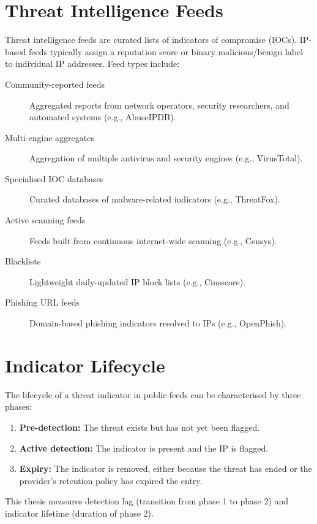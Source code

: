 \documentclass[12pt, a4paper, twoside]{report}
\begin{document}
\section{Threat Intelligence Feeds}

Threat intelligence feeds are curated lists of indicators of compromise (IOCs). IP-based feeds
typically assign a reputation score or binary malicious/benign label to individual IP addresses.
Feed types include:

\begin{description}
  \item[Community-reported feeds] Aggregated reports from network operators, security researchers,
    and automated systems (e.g., AbuseIPDB).
  \item[Multi-engine aggregates] Aggregation of multiple antivirus and security engines
    (e.g., VirusTotal).
  \item[Specialised IOC databases] Curated databases of malware-related indicators
    (e.g., ThreatFox).
  \item[Active scanning feeds] Feeds built from continuous internet-wide scanning
    (e.g., Censys).
  \item[Blacklists] Lightweight daily-updated IP block lists
    (e.g., Cinsscore).
  \item[Phishing URL feeds] Domain-based phishing indicators resolved to IPs
    (e.g., OpenPhish).
\end{description}

\section{Indicator Lifecycle}

The lifecycle of a threat indicator in public feeds can be characterised by three phases:
\begin{enumerate}
  \item \textbf{Pre-detection:} The threat exists but has not yet been flagged.
  \item \textbf{Active detection:} The indicator is present and the IP is flagged.
  \item \textbf{Expiry:} The indicator is removed, either because the threat has ended or
    the provider's retention policy has expired the entry.
\end{enumerate}

This thesis measures detection lag (transition from phase 1 to phase 2) and indicator lifetime
(duration of phase 2).
\end{document}
